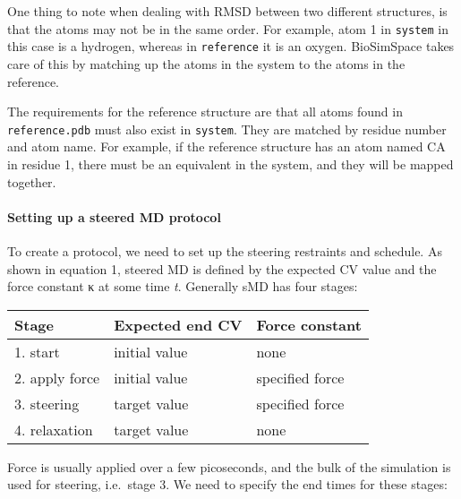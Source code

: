 One thing to note when dealing with RMSD between two different
structures, is that the atoms may not be in the same order. For example,
atom 1 in \texttt{system} in this case is a hydrogen, whereas in
\texttt{reference} it is an oxygen. BioSimSpace takes care of this by
matching up the atoms in the system to the atoms in the reference.

The requirements for the reference structure are that all atoms found in
\texttt{reference.pdb} must also exist in \texttt{system}. They are
matched by residue number and atom name. For example, if the reference
structure has an atom named CA in residue 1, there must be an equivalent
in the system, and they will be mapped together.

\hypertarget{setting-up-a-steered-md-protocol}{%
\paragraph{Setting up a steered MD
protocol}\label{setting-up-a-steered-md-protocol}}

To create a protocol, we need to set up the steering restraints and
schedule. As shown in equation 1, steered MD is defined by the expected
CV value and the force constant κ at some time \emph{t}. Generally sMD
has four stages:

\begin{longtable}[]{@{}lll@{}}
\toprule
Stage & Expected end CV & Force constant\tabularnewline
\midrule
\endhead
1. start & initial value & none\tabularnewline
2. apply force & initial value & specified force\tabularnewline
3. steering & target value & specified force\tabularnewline
4. relaxation & target value & none\tabularnewline
\bottomrule
\end{longtable}

Force is usually applied over a few picoseconds, and the bulk of the
simulation is used for steering, i.e.~stage 3. We need to specify the
end times for these stages:

\begin{Shaded}
\begin{Highlighting}[]
\OperatorTok{=} \OperatorTok{*}
\OperatorTok{=}  \OperatorTok{*}
\OperatorTok{=}  \OperatorTok{*}
\OperatorTok{=}  \OperatorTok{*}
\end{Highlighting}
\end{Shaded}

